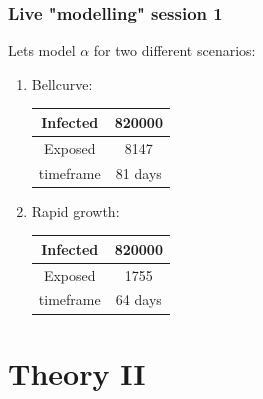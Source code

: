 \documentclass{beamer}
\begin{document}
\begin{frame}
\frametitle{Live "modelling" session 1} 
	Lets model $\alpha$ for  two different scenarios:\\\vspace{0.3cm}
	\begin{enumerate}
		\item Bellcurve:\\\vspace{0.1cm}
			\begin{tabular}{| c | c |}
				\hline
				Infected & 820000 \\
				\hline
				Exposed & 8147 \\
				\hline
				timeframe & 81 days \\
				\hline
			\end{tabular} \vspace{0.5cm}

		\item Rapid growth:\\\vspace{0.1cm}
			\begin{tabular}{| c | c |}
				\hline
				Infected & 820000 \\
				\hline
				Exposed & 1755 \\
				\hline
				timeframe & 64 days \\
				\hline
			\end{tabular}
	\end{enumerate}
\end{frame}

\section{Theory II}
\end{document}
